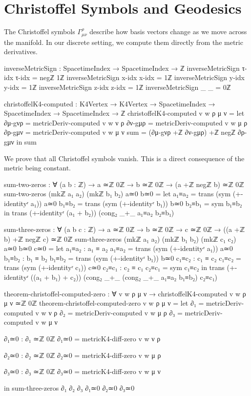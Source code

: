 \documentclass[11pt,a4paper]{book}
\begin{document}
\section{Christoffel Symbols and Geodesics}

The Christoffel symbols $\Gamma^\rho_{\mu\nu}$ describe how basis vectors change as we move across the manifold. In our discrete setting, we compute them directly from the metric derivatives.

\begin{code}
inverseMetricSign : SpacetimeIndex → SpacetimeIndex → ℤ
inverseMetricSign τ-idx τ-idx = negℤ 1ℤ
inverseMetricSign x-idx x-idx = 1ℤ
inverseMetricSign y-idx y-idx = 1ℤ
inverseMetricSign z-idx z-idx = 1ℤ
inverseMetricSign _     _     = 0ℤ

christoffelK4-computed : K4Vertex → K4Vertex → SpacetimeIndex → SpacetimeIndex → SpacetimeIndex → ℤ
christoffelK4-computed v w ρ μ ν = 
  let
      ∂μ-gνρ = metricDeriv-computed v w ν ρ
      ∂ν-gμρ = metricDeriv-computed v w μ ρ
      ∂ρ-gμν = metricDeriv-computed v w μ ν
      sum = (∂μ-gνρ +ℤ ∂ν-gμρ) +ℤ negℤ ∂ρ-gμν
  in sum
\end{code}

We prove that all Christoffel symbols vanish. This is a direct consequence of the metric being constant.

\begin{code}
sum-two-zeros : ∀ (a b : ℤ) → a ≃ℤ 0ℤ → b ≃ℤ 0ℤ → (a +ℤ negℤ b) ≃ℤ 0ℤ
sum-two-zeros (mkℤ a₁ a₂) (mkℤ b₁ b₂) a≃0 b≃0 = 
  let a₁≡a₂ = trans (sym (+-identityʳ a₁)) a≃0
      b₁≡b₂ = trans (sym (+-identityʳ b₁)) b≃0
      b₂≡b₁ = sym b₁≡b₂
  in trans (+-identityʳ (a₁ + b₂)) (cong₂ _+_ a₁≡a₂ b₂≡b₁)

sum-three-zeros : ∀ (a b c : ℤ) → a ≃ℤ 0ℤ → b ≃ℤ 0ℤ → c ≃ℤ 0ℤ → 
                  ((a +ℤ b) +ℤ negℤ c) ≃ℤ 0ℤ
sum-three-zeros (mkℤ a₁ a₂) (mkℤ b₁ b₂) (mkℤ c₁ c₂) a≃0 b≃0 c≃0 = 
  let a₁≡a₂ : a₁ ≡ a₂
      a₁≡a₂ = trans (sym (+-identityʳ a₁)) a≃0
      b₁≡b₂ : b₁ ≡ b₂
      b₁≡b₂ = trans (sym (+-identityʳ b₁)) b≃0
      c₁≡c₂ : c₁ ≡ c₂
      c₁≡c₂ = trans (sym (+-identityʳ c₁)) c≃0
      c₂≡c₁ : c₂ ≡ c₁
      c₂≡c₁ = sym c₁≡c₂
  in trans (+-identityʳ ((a₁ + b₁) + c₂))
           (cong₂ _+_ (cong₂ _+_ a₁≡a₂ b₁≡b₂) c₂≡c₁)

theorem-christoffel-computed-zero : ∀ v w ρ μ ν → christoffelK4-computed v w ρ μ ν ≃ℤ 0ℤ
theorem-christoffel-computed-zero v w ρ μ ν = 
  let ∂₁ = metricDeriv-computed v w ν ρ
      ∂₂ = metricDeriv-computed v w μ ρ
      ∂₃ = metricDeriv-computed v w μ ν
      
      ∂₁≃0 : ∂₁ ≃ℤ 0ℤ
      ∂₁≃0 = metricK4-diff-zero v w ν ρ
      
      ∂₂≃0 : ∂₂ ≃ℤ 0ℤ
      ∂₂≃0 = metricK4-diff-zero v w μ ρ
      
      ∂₃≃0 : ∂₃ ≃ℤ 0ℤ
      ∂₃≃0 = metricK4-diff-zero v w μ ν
      
  in sum-three-zeros ∂₁ ∂₂ ∂₃ ∂₁≃0 ∂₂≃0 ∂₃≃0
\end{code}
\end{document}
